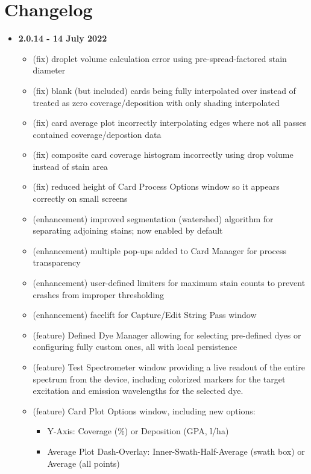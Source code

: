 \documentclass[10pt,letterpaper,titlepage]{article}
\begin{document}
    \newpage

    \section{Changelog}
    \begin{itemize}
        \item \textbf{2.0.14 - 14 July 2022}
        \begin{itemize}
            \item (fix) droplet volume calculation error using pre-spread-factored stain diameter
            \item (fix) blank (but included) cards being fully interpolated over instead of treated as zero coverage/deposition with only shading interpolated
            \item (fix) card average plot incorrectly interpolating edges where not all passes contained coverage/depostion data
            \item (fix) composite card coverage histogram incorrectly using drop volume instead of stain area
            \item (fix) reduced height of Card Process Options window so it appears correctly on small screens
            \item (enhancement) improved segmentation (watershed) algorithm for separating adjoining stains; now enabled by default
            \item (enhancement) multiple pop-ups added to Card Manager for process transparency
            \item (enhancement) user-defined limiters for maximum stain counts to prevent crashes from improper thresholding
            \item (enhancement) facelift for Capture/Edit String Pass window
            \item (feature) Defined Dye Manager allowing for selecting pre-defined dyes or configuring fully custom ones, all with local persistence
            \item (feature) Test Spectrometer window providing a live readout of the entire spectrum from the device, including colorized markers for the target excitation and emission wavelengths for the selected dye.
            \item (feature) Card Plot Options window, including new options:
            \begin{itemize}
                \item Y-Axis: Coverage (\%) or Deposition (GPA, l/ha)
                \item Average Plot Dash-Overlay: Inner-Swath-Half-Average (swath box) or Average (all points)

\end{itemize}
\end{itemize}
\end{itemize}
\end{document}
